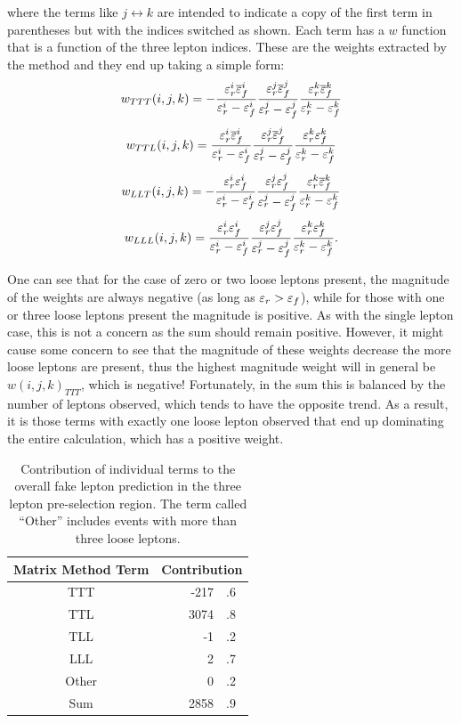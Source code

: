 where the terms like $j\leftrightarrow k$ are intended to indicate
a copy of the first term in parentheses but with the indices 
switched as shown. Each term has a $w$ function that is a function
of the three lepton indices. These are the weights
extracted by the method and they end up taking a simple form:
\begin{equation}
\label{eq:mxm_wttt}
w_{TTT}(i,j,k) = 
-\frac{\varepsilon_r^i\overline{\varepsilon}_f^i}{\varepsilon_r^i-\varepsilon_f^i}
\frac{\varepsilon_r^j\overline{\varepsilon}_f^j}{\varepsilon_r^j-\varepsilon_f^j}
\frac{\varepsilon_r^k\overline{\varepsilon}_f^k}{\varepsilon_r^k-\varepsilon_f^k}
\end{equation}
\begin{equation}
\label{eq:mxm_wttl}
w_{TTL}(i,j,k) = 
\frac{\varepsilon_r^i\overline{\varepsilon}_f^i}{\varepsilon_r^i-\varepsilon_f^i}
\frac{\varepsilon_r^j\overline{\varepsilon}_f^j}{\varepsilon_r^j-\varepsilon_f^j}
\frac{\varepsilon_r^k\varepsilon_f^k}{\varepsilon_r^k-\varepsilon_f^k}
\end{equation}
\begin{equation}
\label{eq:mxm_wllt}
w_{LLT}(i,j,k) =  
- \frac{\varepsilon_r^i\varepsilon_f^i}{\varepsilon_r^i-\varepsilon_f^i}
\frac{\varepsilon_r^j\varepsilon_f^j}{\varepsilon_r^j-\varepsilon_f^j}
\frac{\varepsilon_r^k\overline{\varepsilon}_f^k}{\varepsilon_r^k-\varepsilon_f^k}
\end{equation}
\begin{equation}
\label{eq:mxm_wlll}
w_{LLL}(i,j,k) =  
\frac{\varepsilon_r^i\varepsilon_f^i}{\varepsilon_r^i-\varepsilon_f^i}
\frac{\varepsilon_r^j\varepsilon_f^j}{\varepsilon_r^j-\varepsilon_f^j}
\frac{\varepsilon_r^k\varepsilon_f^k}{\varepsilon_r^k-\varepsilon_f^k}.
\end{equation}


One can see that for the case of zero or two loose leptons present, 
the magnitude of the weights are always negative (as long
as $\varepsilon_r > \varepsilon_f$), while for those with one or three loose leptons 
present the magnitude is positive. As with the single
lepton case, this is not a concern as the sum should remain positive.
However, it might cause some concern to see that 
the magnitude of these weights decrease the more loose leptons 
are present, thus the highest magnitude weight
will in general be $w(i,j,k)_{TTT}$, which is negative!
Fortunately, in the sum this is balanced by the number of 
leptons observed, which tends to have the opposite trend.
As a result, it is those terms with exactly one loose lepton
observed that end up dominating the entire calculation, which
has a positive weight. 

\begin{table}[tb]
\centering
\begin{tabular}{c|cr@{}l}
Matrix Method Term & \multicolumn{3}{c}{Contribution} \\
\hline
\hline
TTT & &-217&.6\\
TTL & &3074&.8 \\
TLL & &-1&.2 \\
LLL & &2&.7 \\ 
Other & &0&.2 \\
\hline
Sum & &2858&.9
\end{tabular}
\label{tab:mxm_components}
\caption{Contribution of individual terms to the overall fake lepton 
prediction in the three lepton pre-selection region. The 
term called ``Other'' includes events with more than three loose leptons. }
\end{table}

